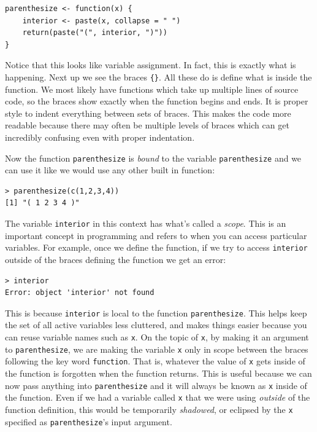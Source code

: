 \documentclass[12pt]{article}
\theoremstyle{remark}
\begin{document}
\begin{Verbatim}[frame=single, fontsize=\small]
parenthesize <- function(x) {
	interior <- paste(x, collapse = " ")
	return(paste("(", interior, ")"))	
}
\end{Verbatim}
Notice that this looks like variable assignment. In fact, this is exactly what is happening. Next up we see the braces \verb|{}|. All these do is define what is inside the function. We most likely have functions which take up multiple lines of source code, so the braces show exactly when the function begins and ends. It is proper style to indent everything between sets of braces. This makes the code more readable because there may often be multiple levels of braces which can get incredibly confusing even with proper indentation.

Now the function \verb|parenthesize| is \emph{bound} to the variable \verb|parenthesize| and we can use it like we would use any other built in function:
\begin{verbatim}
> parenthesize(c(1,2,3,4))
[1] "( 1 2 3 4 )"
\end{verbatim}

The variable \verb|interior| in this context has what's called a \emph{scope}. This is an important concept in programming and refers to when you can access particular variables. For example, once we define the function, if we try to access \verb|interior| outside of the braces defining the function we get an error:
\begin{verbatim}
> interior
Error: object 'interior' not found
\end{verbatim}
This is because \verb|interior| is local to the function \verb|parenthesize|. This helps keep the set of all active variables less cluttered, and makes things easier because you can reuse variable names such as \verb|x|. On the topic of \verb|x|, by making it an argument to \verb|parenthesize|, we are making the variable \verb|x| only in scope between the braces following the key word \verb|function|. That is, whatever the value of \verb|x| gets inside of the function is forgotten when the function returns. This is useful because we can now pass anything into \verb|parenthesize| and it will always be known as \verb|x| inside of the function. Even if we had a variable called \verb|x| that we were using \emph{outside} of the function definition, this would be temporarily \emph{shadowed}, or eclipsed by the \verb|x| specified as \verb|parenthesize|'s input argument.

\end{document}
